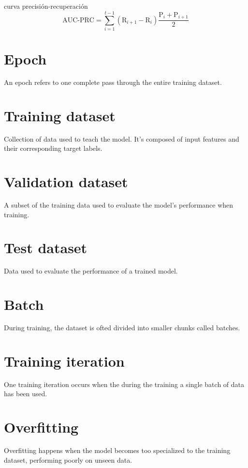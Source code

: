 \section{}
curva precisión-recuperación
\begin{equation}
  \text{AUC-PRC} = \sum_{i=1}^{t-1}(\text{R}_{i+1}-\text{R}_i)\frac{\text{P}_i+\text{P}_{i+1}}{2}
\end{equation}

\section{Epoch}
An epoch refers to one complete pass through the entire training dataset.

\section{Training dataset}
Collection of data used to teach the model. It's composed of input
features and their corresponding target labels.

\section{Validation dataset}
A subset of the training data used to evaluate the model's performance
when training.

\section{Test dataset}
Data used to evaluate the performance of a trained model.

\section{Batch}
During training, the dataset is ofted divided into smaller chunks
called batches.

\section{Training iteration}
One training iteration occurs when the during the training a single
batch of data has been used.

\section{Overfitting}
Overfitting happens when the model becomes too specialized to the
training dataset, performing poorly on unseen data.

